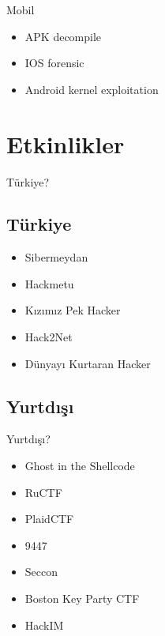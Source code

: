 \documentclass[compress]{beamer}
\begin{document}
\begin{frame}{Mobil}

\begin{itemize}
	\item APK decompile
    \item IOS forensic
    \item Android kernel exploitation
\end{itemize}

\end{frame}

\section{Etkinlikler}

\begin{frame}{Türkiye?}

\subsection{Türkiye}

\begin{itemize}
	\item Sibermeydan
    \item Hackmetu
    \item Kızımız Pek Hacker
    \item Hack2Net
    \item Dünyayı Kurtaran Hacker
\end{itemize}

\end{frame}

\subsection{Yurtdışı}

\begin{frame}{Yurtdışı?}

\begin{itemize}
	\item Ghost in the Shellcode
    \item RuCTF
    \item PlaidCTF
    \item 9447
    \item Seccon
    \item Boston Key Party CTF
    \item HackIM
\end{itemize}

\end{frame}
\end{document}
